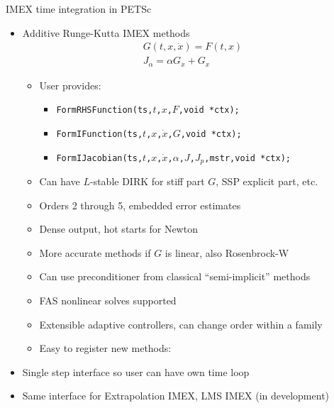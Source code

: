 \begin{frame}{IMEX time integration in PETSc}
  \begin{itemize}
  \item Additive Runge-Kutta IMEX methods
    \begin{gather*}
      G(t,x,\dot x) = F(t,x) \\
      J_\alpha = \alpha G_{\dot x} + G_x
    \end{gather*}
    \vspace{-1em}
    \begin{itemize}
    \item User provides:
      \begin{itemize}
      \item \texttt{FormRHSFunction(ts,$t$,$x$,$F$,void *ctx);}
      \item \texttt{FormIFunction(ts,$t$,$x$,$\dot x$,$G$,void *ctx);}
      \item \texttt{FormIJacobian(ts,$t$,$x$,$\dot x$,$\alpha$,$J$,$J_{p}$,mstr,void *ctx);}
      \end{itemize}
    \item Can have $L$-stable DIRK for stiff part $G$, SSP explicit part, etc.
    \item Orders 2 through 5, embedded error estimates
    \item Dense output, hot starts for Newton
    \item More accurate methods if $G$ is linear, also Rosenbrock-W
    \item Can use preconditioner from classical ``semi-implicit'' methods
    \item FAS nonlinear solves supported
    \item Extensible adaptive controllers, can change order within a family
    \item Easy to register new methods: 
    \end{itemize}
  \item Single step interface so user can have own time loop
  \item Same interface for Extrapolation IMEX, LMS IMEX (in development)
  \end{itemize}
\end{frame}
